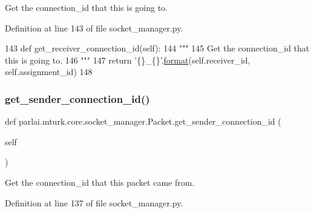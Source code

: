 \begin{DoxyVerb}Get the connection_id that this is going to.
\end{DoxyVerb}
 

Definition at line 143 of file socket\+\_\+manager.\+py.


\begin{DoxyCode}
143     \textcolor{keyword}{def }get\_receiver\_connection\_id(self):
144         \textcolor{stringliteral}{"""}
145 \textcolor{stringliteral}{        Get the connection\_id that this is going to.}
146 \textcolor{stringliteral}{        """}
147         \textcolor{keywordflow}{return} \textcolor{stringliteral}{'\{\}\_\{\}'}.\hyperlink{namespaceparlai_1_1chat__service_1_1services_1_1messenger_1_1shared__utils_a32e2e2022b824fbaf80c747160b52a76}{format}(self.receiver\_id, self.assignment\_id)
148 
\end{DoxyCode}
\mbox{\label{classparlai_1_1mturk_1_1core_1_1socket__manager_1_1Packet_ad472844f177969be64004bc0fd7031d9}} 
\subsubsection{\texorpdfstring{get\+\_\+sender\+\_\+connection\+\_\+id()}{get\_sender\_connection\_id()}}
{\footnotesize\ttfamily def parlai.\+mturk.\+core.\+socket\+\_\+manager.\+Packet.\+get\+\_\+sender\+\_\+connection\+\_\+id (\begin{DoxyParamCaption}\item[{}]{self }\end{DoxyParamCaption})}

\begin{DoxyVerb}Get the connection_id that this packet came from.
\end{DoxyVerb}
 

Definition at line 137 of file socket\+\_\+manager.\+py.



